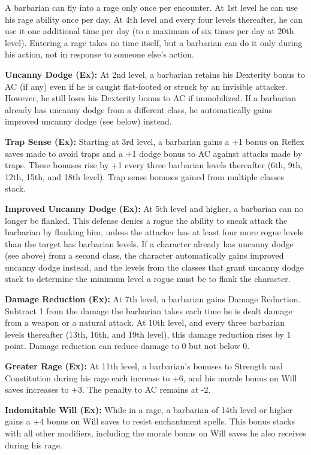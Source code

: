 \documentclass{article}
\begin{document}
A barbarian can fly into a rage only once per encounter. At 1st level he can use 
his rage ability once per day. At 4th level and every four levels thereafter, he 
can use it one additional time per day (to a maximum of six times per day at 20th 
level). Entering a rage takes no time itself, but a barbarian can do it only during 
his action, not in response to someone else's action.

\textbf{Uncanny Dodge (Ex): }At 2nd level, a barbarian retains his Dexterity bonus 
to AC (if any) even if he is caught flat-footed or struck by an invisible attacker. 
However, he still loses his Dexterity bonus to AC if immobilized. If a barbarian 
already has uncanny dodge from a different class, he automatically gains improved 
uncanny dodge (see below) instead.

\textbf{Trap Sense (Ex):} Starting at 3rd level, a barbarian gains a +1 bonus on 
Reflex saves made to avoid traps and a +1 dodge bonus to AC against attacks made 
by traps. These bonuses rise by +1 every three barbarian levels thereafter (6th, 
9th, 12th, 15th, and 18th level). Trap sense bonuses gained from multiple classes 
stack.

\textbf{Improved Uncanny Dodge (Ex):} At 5th level and higher, a barbarian can 
no longer be flanked. This defense denies a rogue the ability to sneak attack the 
barbarian by flanking him, unless the attacker has at least four more rogue levels 
than the target has barbarian levels. If a character already has uncanny dodge 
(see above) from a second class, the character automatically gains improved uncanny 
dodge instead, and the levels from the classes that grant uncanny dodge stack to 
determine the minimum level a rogue must be to flank the character.

\textbf{Damage Reduction (Ex):} At 7th level, a barbarian gains Damage Reduction. 
Subtract 1 from the damage the barbarian takes each time he is dealt damage from 
a weapon or a natural attack. At 10th level, and every three barbarian levels thereafter 
(13th, 16th, and 19th level), this damage reduction rises by 1 point. Damage reduction 
can reduce damage to 0 but not below 0.

\textbf{Greater Rage (Ex):} At 11th level, a barbarian's bonuses to Strength and 
Constitution during his rage each increase to +6, and his morale bonus on Will 
saves increases to +3. The penalty to AC remains at -2.

\textbf{Indomitable Will (Ex):} While in a rage, a barbarian of 14th level or higher 
gains a +4 bonus on Will saves to resist enchantment spells. This bonus stacks 
with all other modifiers, including the morale bonus on Will saves he also receives 
during his rage.
\end{document}
